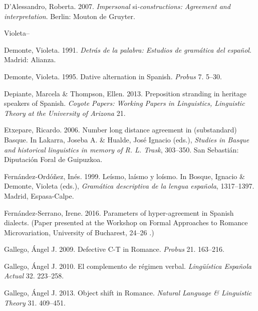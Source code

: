 \documentclass[output=paper]{langsci/langscibook}
\begin{document}
\begin{styleBodyTextIn}
D’Alessandro, Roberta. 2007. \textit{Impersonal} si\textit{{}-constructions: Agreement and interpretation}. Berlin: Mouton de Gruyter.
\end{styleBodyTextIn}

 Violeta–

Demonte, Violeta. 1991. \textit{Detrás de la palabra: Estudios de gramática del español}. Madrid: Alianza.

Demonte, Violeta. 1995. Dative alternation in Spanish. \textit{Probus} 7. 5–30.

Depiante, Marcela \& Thompson, Ellen. 2013. Preposition stranding in heritage speakers of Spanish. \textit{Coyote Papers: Working Papers in Linguistics, Linguistic Theory at the University of Arizona} 21. 

Etxepare, Ricardo. 2006. Number long distance agreement in (substandard) Basque. In Lakarra, Joseba A. \& Hualde, José Ignacio (eds.), \textit{Studies in Basque and historical linguistics in memory of R. L. Trask}, 303–350. San Sebastián: Diputación Foral de Guipuzkoa.

\begin{styleBodyTextIn}
Fernández-Ordóñez, Inés. 1999. Leísmo, laísmo y loísmo. In Bosque, Ignacio \& Demonte, Violeta (eds.), \textit{Gramática descriptiva de la lengua española}, 1317–1397. Madrid, Espasa-Calpe.
\end{styleBodyTextIn}

Fernández-Serrano, Irene. 2016. Parameters of hyper-agreement in Spanish dialects. (Paper presented at the Workshop on Formal Approaches to Romance Microvariation, University of Bucharest, 24–26 \citealt{November2016}.)

\begin{styleBodyTextIn}
Gallego, Ángel J. 2009. Defective C-T in Romance. \textit{Probus} 21. 163–216.
\end{styleBodyTextIn}

\begin{styleBodyTextIn}
Gallego, Ángel J. 2010. El complemento de régimen verbal. \textit{Lingüística Española Actual} 32. 223–258. 
\end{styleBodyTextIn}

Gallego, Ángel J. 2013. Object shift in Romance. \textit{Natural Language \& Linguistic Theory} 31. 409–451.
\end{document}

